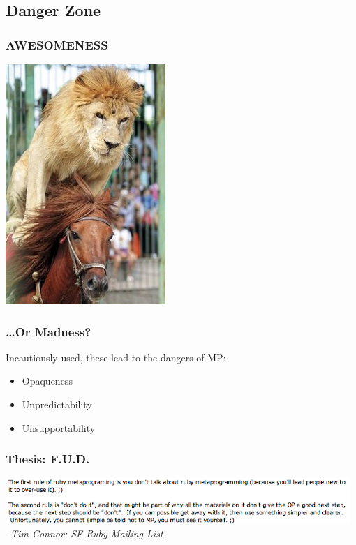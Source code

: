 \documentclass[slidestop,compress,mathserif]{beamer}
\begin{document}
\subsection{Danger Zone} %
\label{sub:danger_zone}

\begin{frame}
		\frametitle{AWESOMENESS}
		\begin{center}
			\includegraphics[scale=0.45]{img/lion_horse.jpg}
		\end{center}			
\end{frame}

\begin{frame}
	\frametitle{{\ldots}Or Madness?}
	Incautiously used, these lead to the dangers of MP:
	\begin{itemize}
		\item Opaqueness
		\item Unpredictability
		\item Unsupportability
	\end{itemize}
\end{frame}

\begin{frame}
	\frametitle{Thesis:  F.U.D.}
		\includegraphics[width=0.98\textwidth, height=0.25\textheight]{img/tim_hates_mp.png}		
		\vskip 0.5cm
		\emph{--Tim Connor:  SF Ruby Mailing List}
\end{frame}
\end{document}
